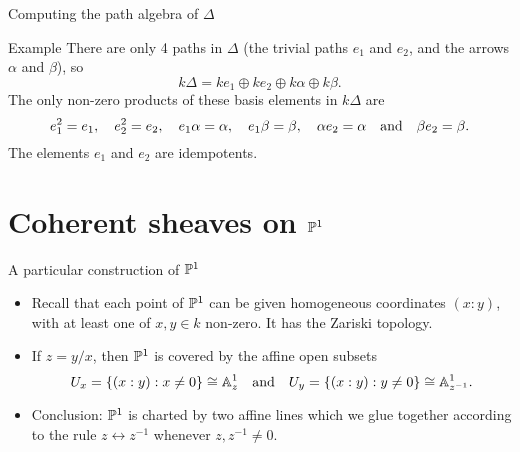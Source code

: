 \documentclass[
  xcolor=dvipsnames,
  aspectratio=169,
  compress
]{beamer}
\begin{document}
\begin{frame}{Computing the path algebra of $\Delta$}
  \begin{exampleblock}{Example}
    There are only 4 paths in $\Delta$ (the trivial paths $e_1$ and $e_2$, and the arrows $\alpha$ and $\beta$), so
    \[
      k \Delta = k e_1 \oplus k e_2 \oplus k \alpha \oplus k \beta.
    \]
    \pause
    The only non-zero products of these basis elements in $k \Delta$ are
    \[
      e_1^2 = e_1, \quad
      e_2^2 = e_2, \quad
      e_1 \alpha = \alpha, \quad
      e_1 \beta = \beta, \quad
      \alpha e_2 = \alpha \quad \text{and} \quad
      \beta e_2 = \beta.
    \]
    The elements $e_1$ and $e_2$ are \alert{idempotents}.
  \end{exampleblock}
\end{frame}

\section{Coherent sheaves on $\mathbb{P}^{{1}}$}

\iffalse
\begin{frame}{The affine line}
  \begin{itemize}
    \item
      Recall that $\aff{1} = k$ has a topology by declaring that the \alert{closed} sets are
      \[
        V(I) := \{a \in \aff{1}: f(a) = 0 \text{ for all } f \in I\}
      \]
      for an ideal $I \idealof k[x]$.

    \item
      Since $k[x]$ is a PID, $I = \gen{f}$, so $V(I)$ is actually just the zeros of $f$.
  \end{itemize}

  \pause
  \begin{corollary}
    If $U \subseteq \aff{1}$ is open, then $U = D(f) := \{a \in \aff{1}: f(a) \alert{\neq} 0\}$ for some $f \in k[x]$.
    Every open subset of $U$ is of the form $D(fg)$ for some $g \in k[x]$.
  \end{corollary}
\end{frame}
\fi

\begin{frame}{A particular construction of $\mathbb{P}^{{1}}$}
  \begin{itemize}
    \item
      Recall that each point of $\mathbb{P}^{{1}}$ can be given \alert{homogeneous coordinates} $(x : y)$, with at least one of $x, y \in k$ non-zero.
      It has the Zariski topology.

      \pause
    \item
      If $z = y/x$, then $\mathbb{P}^{{1}}$ is covered by the affine open subsets
      \[
        U_x = \{(x : y): x \neq 0\} \cong \mathbb{A}^{{1}}_z
        \quad \text{and} \quad
        U_y = \{(x : y): y \neq 0\} \cong \mathbb{A}^{{1}}_{z^{-1}}.
      \]

      \pause
    \item
      Conclusion: $\mathbb{P}^{{1}}$ is \alert{charted} by two affine lines which we glue together according to the rule $z \leftrightarrow z^{-1}$ whenever $z, z^{-1} \neq 0$.
  \end{itemize}
\end{frame}
\end{document}
